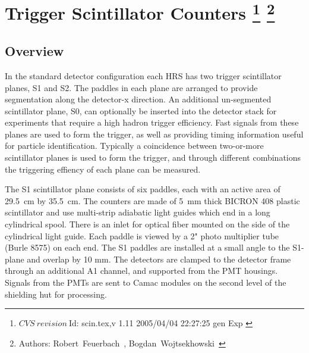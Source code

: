 \chapter[Trigger Scintillator Counters]{Trigger Scintillator Counters
  \footnote{
    $CVS~revision~ $Id: scin.tex,v 1.11 2005/04/04 22:27:25 gen Exp $ $
  }
  \footnote{Authors: Robert~Feuerbach~,
    Bogdan~Wojtsekhowski~}
}
\section{Overview}

\newcommand{\unit}[1]{\,\mbox{\ensuremath{\mathrm{#1}}}}

In the standard detector configuration each HRS has two trigger
scintillator planes, S1 and S2. The paddles in each plane are arranged to
provide segmentation along the detector-x direction. An additional
un-segmented scintillator plane, S0, can optionally be inserted into the
detector stack for experiments that require a high hadron trigger
efficiency. Fast signals from
these planes are used to form the trigger, as well as providing timing
information useful for particle identification.  Typically a coincidence between
two-or-more scintillator planes is used to form the trigger, and
through different combinations the triggering effiency of each plane can
be measured.

The S1 scintillator plane consists of six paddles, each with an active area
of 29.5~cm by 35.5~cm. The counters are made of 5~mm thick BICRON 408
plastic scintillator and use multi-strip adiabatic light guides which end
in a long cylindrical spool. There is an inlet for optical fiber mounted on
the side of the cylindrical light guide. Each paddle is viewed by a 2"
photo multiplier tube (Burle 8575) on each end.  The S1 paddles are
installed at a small angle to the S1-plane and overlap by 10 mm.  The
detectors are clamped to the detector frame through an additional A1
channel, and supported from the PMT housings. 
Signals from the PMTs are sent to Camac
modules on the second level of the shielding hut for processing.

